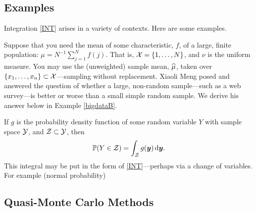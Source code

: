 \documentclass[graybox]{svmult}
\newcommand{\bsy}{\boldsymbol{y}}    %
\begin{document}
\subsection{Examples}
Integration \eqref{INT} arises in a variety of contexts.  Here are some examples.

\begin{example}  \label{bigdataA} Suppose that you need the mean of some characteristic, $f$, of a large, finite population: $\mu = N^{-1} \sum_{j=1}^N f(j)$.  That is, $\mathcal{X} = \{1, \ldots, N\}$, and $\nu$ is the uniform measure.  You may use the (unweighted) sample mean, $\widehat{\mu}$, taken over $\{x_1, \ldots, x_n\} \subset \mathcal{X}$---sampling without replacement.  Xiaoli Meng \cite{} posed and answered the question of whether a large, non-random sample---such as a web survey---is better or worse than a small simple random sample.  We derive his answer below in Example \ref{bigdataB}.
\end{example}

\begin{example} \label{MultivarProbA} If $g$ is the probability density function of some random variable $Y$ with sample space $\mathcal{Y}$, and $\mathcal{Z} \subset \mathcal{Y}$, then 
\[
\Prob(Y \in \cz) = \int_{\cz} g(\bsy) \, \D \bsy.
\]
This integral may be put in the form of \cref{INT}---perhaps via a change of variables.  For example (normal probability)
\end{example}

\begin{example}
\end{example}

\begin{example}
\end{example}

\subsection{Quasi-Monte Carlo Methods}
\end{document}

